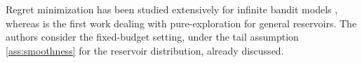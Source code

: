 Regret minimization has been studied
extensively for infinite bandit models
\citep{berry1997,wang2008, bonald2013two,
david2014infinitely}, whereas
\cite{DBLP:journals/corr/CarpentierV15} is the first work dealing with
pure-exploration for general reservoirs. The authors consider the fixed-budget
setting, under the tail
assumption \eqref{ass:smoothness} for the reservoir distribution,
already discussed.


